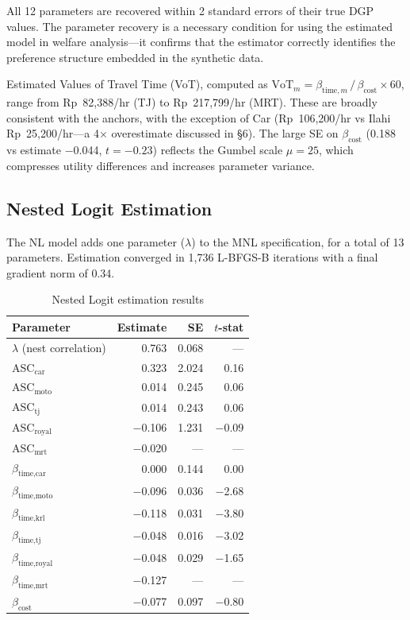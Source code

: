 \documentclass[12pt,a4paper]{article}
\begin{document}
All 12 parameters are recovered within 2 standard errors of their true DGP values. The parameter recovery is a necessary condition for using the estimated model in welfare analysis---it confirms that the estimator correctly identifies the preference structure embedded in the synthetic data.

Estimated Values of Travel Time (VoT), computed as $\text{VoT}_m = \beta_{\text{time},m} \,/\, \beta_{\text{cost}} \times 60$, range from Rp~82,388/hr (TJ) to Rp~217,799/hr (MRT). These are broadly consistent with the \citet{ilahi2021} anchors, with the exception of Car (Rp~106,200/hr vs Ilahi Rp~25,200/hr---a 4$\times$ overestimate discussed in \S 6). The large SE on $\beta_{\text{cost}}$ (0.188 vs estimate $-$0.044, $t = -0.23$) reflects the Gumbel scale $\mu = 25$, which compresses utility differences and increases parameter variance.

\subsection{Nested Logit Estimation}

The NL model adds one parameter ($\lambda$) to the MNL specification, for a total of 13 parameters. Estimation converged in 1,736 L-BFGS-B iterations with a final gradient norm of 0.34.

\begin{table}[ht]
\centering
\caption{Nested Logit estimation results}
\label{tab:nl}
\begin{tabular}{lrrr}
\toprule
Parameter & Estimate & SE & $t$-stat \\
\midrule
$\lambda$ (nest correlation) & 0.763  & 0.068  & --- \\
ASC$_{\text{car}}$           & 0.323  & 2.024  & 0.16 \\
ASC$_{\text{moto}}$          & 0.014  & 0.245  & 0.06 \\
ASC$_{\text{tj}}$            & 0.014  & 0.243  & 0.06 \\
ASC$_{\text{royal}}$         & $-$0.106 & 1.231  & $-$0.09 \\
ASC$_{\text{mrt}}$           & $-$0.020 & ---    & --- \\
$\beta_{\text{time,car}}$    & 0.000  & 0.144  & 0.00 \\
$\beta_{\text{time,moto}}$   & $-$0.096 & 0.036  & $-$2.68 \\
$\beta_{\text{time,krl}}$    & $-$0.118 & 0.031  & $-$3.80 \\
$\beta_{\text{time,tj}}$     & $-$0.048 & 0.016  & $-$3.02 \\
$\beta_{\text{time,royal}}$  & $-$0.048 & 0.029  & $-$1.65 \\
$\beta_{\text{time,mrt}}$    & $-$0.127 & ---    & --- \\
$\beta_{\text{cost}}$        & $-$0.077 & 0.097  & $-$0.80 \\
\bottomrule
\end{tabular}
\end{table}
\end{document}
